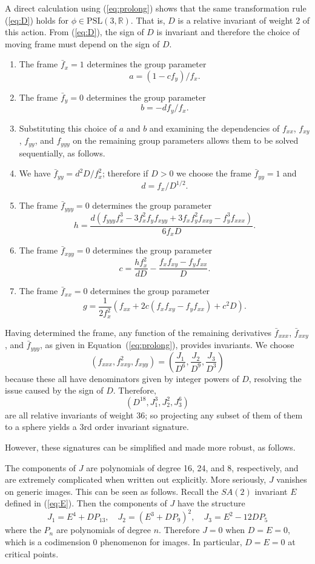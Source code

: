 \documentclass[review,onefignum,onetabnum]{siamonline190516}
\def\R{\mathbb{R}}
\begin{document}
A direct calculation using (\ref{eq:prolong}) shows that the same transformation rule (\ref{eq:D}) holds for $\phi\in\mathrm{PSL}(3,\R)$.  That is, $D$ is a relative invariant of weight 2 of this action. From (\ref{eq:D}), the sign of $D$ is invariant and therefore the choice of moving frame must depend on the sign of $D$.

\begin{enumerate}
\item The frame $\bar f_x = 1$  determines the group parameter $$a = (1-c f_y)/f_x.$$
\item The frame $\bar f_y=  0$ determines the group parameter $$b = -d f_y/f_x.$$
\item Substituting this choice of $a$ and $b$ and examining the dependencies of $f_{xx}$, $f_{xy}$, $f_{yy}$, and $f_{yyy}$ on the remaining group parameters allows them to be solved sequentially, as follows.
\item We have $\bar f_{yy} = d^2 D/f_x^2$; therefore if $D>0$ we choose the frame
$\bar f_{yy} = 1$ and $$d = f_x/D^{1/2}.$$
\item The frame $\bar f_{yyy} = 0$ determines the group parameter
$$ h = \frac{d(f_{yyy}f_x^3 - 3 f_x^2 f_y f_{xyy} + 3 f_x f_y^2 f_{xxy} - f_y^3 f_{xxx})}{6 f_x D}.$$
\item The frame $\bar f_{xyy}=0$ determines the group parameter
$$ c = \frac{h f_x^2}{d D} - \frac{f_x f_{xy} - f_y f_{xx}}{D}.$$
\item The frame $\bar f_{xx}=0$ determines the group parameter
$$ g = \frac{1}{2 f_x^2}(f_{xx} + 2 c ( f_x f_{xy} - f_y f_{xx} ) + c^2 D).$$
\end{enumerate}

Having determined the frame, any function of the remaining derivatives $\bar f_{xxx}$, $\bar f_{xxy}$, and $\bar f_{yyy}$, as given in Equation~(\ref{eq:prolong}), provides invariants. We choose $$ (f_{xxx}, f_{xxy}^2, f_{xyy})=\left(\frac{J_1}{D^6},\frac{J_2}{D^9},\frac{J_3}{D^3}\right)$$
because these all have denominators given by integer powers  of $D$, resolving the issue caused
by the sign of $D$. Therefore,
$$ (D^{18}, J_1^3, J_2^2, J_3^6)$$
are all relative invariants of weight 36; so projecting any subset of them of them to a sphere
yields a 3rd order invariant signature.

However, these signatures can be simplified and made more robust, as follows.

The components of $J$ are polynomials of degree 16, 24, and 8, respectively, and are extremely complicated when written out explicitly. More seriously, $J$ vanishes on generic images. This can be seen as follows. 
Recall the $SA(2)$ invariant $E$ defined in (\ref{eq:E}).
Then the components of $J$ have the structure
$$ J_1 = E^4 + D P_{13},\quad J_2 = (E^3 + D P_9)^2,\quad J_3=E^2 -12 D P_5$$
where the $P_n$ are polynomials of degree $n$. Therefore $J=0$ when $D=E=0$, which 
is a codimension 0 phenomenon for images. In particular, $D=E=0$ at critical points.
\end{document}

